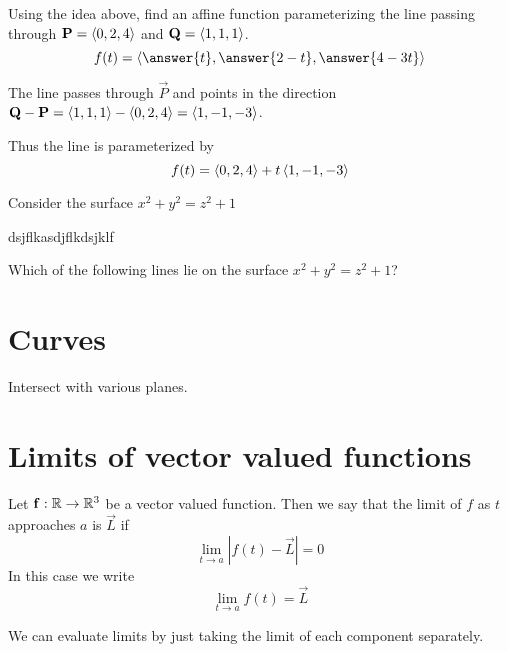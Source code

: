 \documentclass{ximera}
\begin{document}
\begin{question}
  Using the idea above, find an affine function parameterizing the
  line passing through $\mathbf{P} = \left\langle 0,2,4\right\rangle$ and $\mathbf{Q} =
  \left\langle 1,1,1\right\rangle$.
  \[
  f(t) = \vector{\answer{t},\answer{2-t},\answer{4-3t}}
  \]
  \begin{hint}
    The line passes through $\vec{P}$ and points in the direction
    $\mathbf{Q} - \mathbf{P} = \left\langle 1,1,1\right\rangle - \left\langle 0,2,4\right\rangle =
    \left\langle 1,-1,-3\right\rangle$.
  \end{hint}
  \begin{hint}
    Thus the line is parameterized by 
    \[
    f(t) = \left\langle 0,2,4\right\rangle+t\left\langle 1,-1,-3\right\rangle
    \]
  \end{hint}
\end{question}



\begin{question}
  Consider the surface $x^2+y^2=z^2+1$
  \begin{image}
    dsjflkasdjflkdsjklf
  \end{image}
  Which of the following lines lie on the surface $x^2+y^2=z^2+1$?

  
\end{question}



\section{Curves}



Intersect with various planes.


\section{Limits of vector valued functions}

\begin{definition}
  Let $\mathbf{f}:\mathbb R \to \mathbb R^3$ be a vector valued function.  Then we say
  that the limit of $f$ as $t$ approaches $a$ is $\vec{L}$ if
  \[
  \lim_{t \to a} \left| f(t) - \vec{L}\right| = 0
  \]
  In this case we write
  \[
  \lim_{t \to a} f(t) = \vec{L}
  \]
\end{definition}

We can evaluate limits by just taking the limit of each component
separately.
\end{document}
